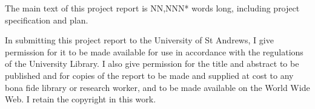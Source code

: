 \documentclass[]{report}
\begin{document}
    The main text of this project report is  NN,NNN* words long, including project specification and plan.

    In submitting this project report to the University of
    St Andrews, I give permission for it to be made
    available for use in accordance with the regulations of
    the University Library. I also give permission for
    the title and abstract to be published and for copies of
    the report to be made and supplied at cost to any bona
    fide library or research worker, and to be made
    available on the World Wide Web. I retain the
    copyright in this work.











\nocite{*}
\printbibliography
\end{document}
